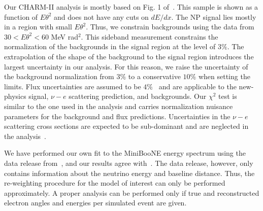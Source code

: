 Our CHARM-II analysis is mostly based on Fig. 1 of~\cite{Vilain:1994qy}. This sample is shown as a function of $E\theta^2$ and does not have any cuts on $dE/dx$. The NP signal lies mostly in a region with small $E\theta^2$. Thus, we constrain backgrounds using the data from $30 < E\theta^2 < 60$ MeV rad$^2$. This sideband measurement constrains the normalization of the backgrounds in the signal region at the level of $3\%$.
The extrapolation of the shape of the background to the signal region introduces the largest uncertainty in our analysis. For this reason, we raise the uncertainty of the background normalization from $3\%$ to a conservative $10 \%$ when setting the limits. Flux uncertainties are assumed to be $4\%$~\cite{Allaby:1987bb} and are applicable to the new-physics signal, $\nu-e$ scattering prediction, and backgrounds. 
Our $\chi^2$ test is similar to the one used in the \minerva analysis and carries normalization nuisance parameters for the background and flux predictions. Uncertainties in the $\nu-e$ scattering cross sections are expected to be sub-dominant and are neglected in the analysis~\cite{deGouvea:2006hfo}.

We have performed our own fit to the MiniBooNE energy spectrum using the data release from~\cite{Aguilar-Arevalo:2018gpe}, and our results agree with~\cite{Bertuzzo:2018itn}. The data release, however, only contains information about the neutrino energy and baseline distance. Thus, the re-weighting procedure for the model of interest can only be performed approximately. A proper analysis can be performed only if true and reconstructed electron angles and energies per simulated event are given.  


